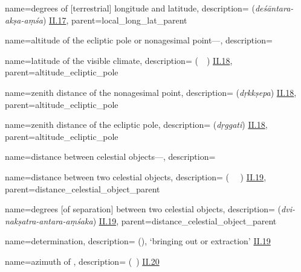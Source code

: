 {
        name={degrees of [terrestrial] longitude and latitude},
        description={ (\textit{deśāntara-akṣa-aṃśa}) \hyperlink{Sii17}{II.17}},
        parent={local_long_lat_parent}
}        

{
        name={altitude of the ecliptic pole or nonagesimal point---},
        description={\phantom{x}\nopagebreak}
}

{
        name={latitude of the visible climate},
        description={  (\ard\idafaconsonant\ \iqlim\idafaconsonant\ \ruyat) \hyperlink{Pii18}{II.18}},
        parent={altitude_ecliptic_pole}
}

{
        name={zenith distance of the nonagesimal point},
        description={ (\textit{dṛkkṣepa}) \hyperlink{Sii18}{II.18}},
        parent={altitude_ecliptic_pole}
}


{
        name={zenith distance of the ecliptic pole},
        description={ (\textit{dṛggati}) \hyperlink{Sii18}{II.18}},
        parent={altitude_ecliptic_pole}
}

{
        name={distance between celestial objects---},
        description={\phantom{x}\nopagebreak}
}

{
        name={distance between two celestial objects},
        description={ (\bud\idafaconsonant\ \miyan\idafaconsonant\ \mbox{\duvum\idafaconsonant} \kawkab) \hyperlink{Pii19}{II.19}},
        parent={distance_celestial_object_parent}
}

{
        name={degrees [of separation] between two celestial objects},
        description={ (\textit{dvi-nakṣatra-antara-aṃśaka}) \hyperlink{Sii19}{II.19}},
        parent={distance_celestial_object_parent}
}

{
        name={determination},
        description={ (\istikhraj), \lit `bringing out or extraction' \hyperlink{Pii19}{II.19}}
}

{
        name={azimuth of \qibla},
        description={ (\samt\idafaconsonant\ \qibla) \hyperlink{Pii20}{II.20}}
}

